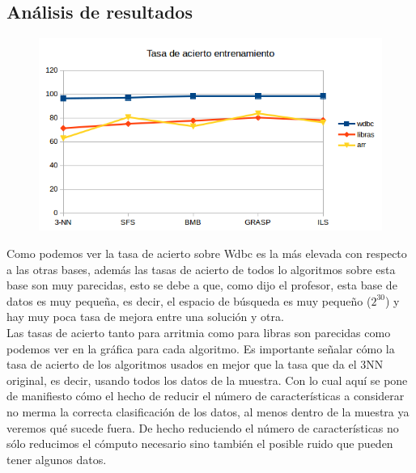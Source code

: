 \documentclass[10pt,a4paper]{article}
\begin{document}
\subsection{\color[rgb]{0.0,0.0,0.51}Análisis de resultados}


\begin{figure}[H]
\centering
\includegraphics[width=130mm]{tasa_train.png}
\end{figure}

Como podemos ver la tasa de acierto sobre Wdbc es la más elevada con respecto a las otras bases, además las tasas de acierto de todos lo algoritmos sobre esta base son muy parecidas, esto se debe a que, como dijo el profesor, esta base de datos es muy pequeña, es decir, el espacio de búsqueda es muy pequeño ($2^{30}$) y hay muy poca tasa de mejora entre una solución y otra.\\

Las tasas de acierto tanto para arritmia como para libras son parecidas como podemos ver en la gráfica para cada algoritmo. Es importante señalar cómo la tasa de acierto de los algoritmos usados en mejor que la tasa que da el 3NN original, es decir, usando todos los datos de la muestra. Con lo cual aquí se pone de manifiesto cómo el hecho de reducir el número de características a considerar no merma la correcta clasificación de los datos, al menos dentro de la muestra ya veremos qué sucede fuera. De hecho reduciendo el número de características no sólo reducimos el cómputo necesario sino también el posible ruido que pueden tener algunos datos.\\
\end{document}
